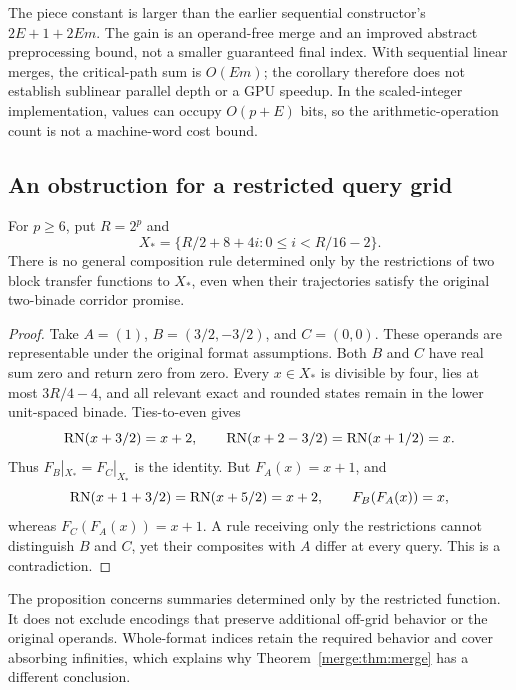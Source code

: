 The piece constant is larger than the earlier sequential constructor's
$2E+1+2Em$. The gain is an operand-free merge and an improved abstract
preprocessing bound, not a smaller guaranteed final index. With sequential
linear merges, the critical-path sum is $O(Em)$; the corollary therefore
does not establish sublinear parallel depth or a GPU speedup. In the
scaled-integer implementation, values can occupy $O(p+E)$ bits, so
the arithmetic-operation count is not a machine-word cost bound.

\subsection{An obstruction for a restricted query grid}

\begin{theorem}\label{merge:prop:obstruction}
For $p\geq6$, put $R=2^p$ and
\[
 X_\ast=\{R/2+8+4i:0\leq i<R/16-2\}.
\]
There is no general composition rule determined only by the restrictions
of two block transfer functions to $X_\ast$, even when their trajectories
satisfy the original two-binade corridor promise.
\end{theorem}

\begin{proof}
Take $A=(1)$, $B=(3/2,-3/2)$, and $C=(0,0)$. These operands are
representable under the original format assumptions. Both $B$ and $C$
have real sum zero and return zero from zero. Every $x\in X_\ast$ is
divisible by four, lies at most $3R/4-4$, and all relevant exact and
rounded states remain in the lower unit-spaced binade. Ties-to-even gives
\[
 \operatorname{RN}(x+3/2)=x+2,\qquad
 \operatorname{RN}(x+2-3/2)=\operatorname{RN}(x+1/2)=x.
\]
Thus $F_B|_{X_\ast}=F_C|_{X_\ast}$ is the identity. But $F_A(x)=x+1$,
and
\[
 \operatorname{RN}(x+1+3/2)=\operatorname{RN}(x+5/2)=x+2,
 \qquad F_B(F_A(x))=x,
\]
whereas $F_C(F_A(x))=x+1$. A rule receiving only the restrictions cannot
distinguish $B$ and $C$, yet their composites with $A$ differ at every
query. This is a contradiction.
\end{proof}

The proposition concerns summaries determined only by the restricted
function. It does not exclude encodings that preserve additional
off-grid behavior or the original operands. Whole-format indices retain
the required behavior and cover absorbing infinities, which explains
why Theorem~\ref{merge:thm:merge} has a different conclusion.
